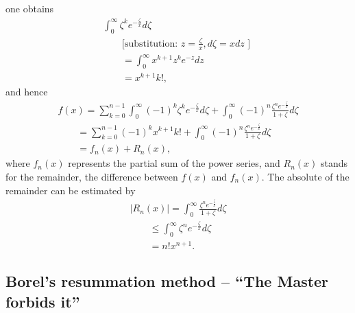 {\begin{equation}
\label{2011-m-ch-dsee15}
\end{equation}
one obtains
\begin{equation}
\begin{split}
\int_0^\infty  \zeta^k  e^{-\frac{\zeta}{x}}   d\zeta     \\
\qquad \textrm{[substitution:  }z=\frac{\zeta}{x}, d \zeta =x dz  \textrm{ ]  } \\
\qquad = \int_0^\infty x^{k+1} z^k  e^{-z}   dz
\\
\qquad =  x^{k+1} k! ,
\end{split}
\label{2011-m-ch-dsee16}
\end{equation}
and hence
\begin{equation}
\begin{split}
f(x)  =
\sum_{k=0}^{n-1}\int_0^\infty (-1)^k \zeta^k  e^{-\frac{\zeta}{x}}   d\zeta
 +
\int_0^\infty (-1)^n \frac{\zeta^ne^{-\frac{\zeta}{x}}}{1+\zeta}
d\zeta  \\
\qquad =
\sum_{k=0}^{n-1}  (-1)^k x^{k+1} k!
 +
\int_0^\infty (-1)^n \frac{\zeta^ne^{-\frac{\zeta}{x}}}{1+\zeta}
d\zeta  \\
\qquad =
f_n(x)  +R_n(x),
\end{split}
\label{2011-m-ch-dsee17}
\end{equation}
where $f_n(x)$ represents the partial sum of the power series, and $R_n(x)$ stands for the remainder,
the difference between $f(x)$ and $f_n(x)$.
The absolute of the remainder can be estimated by
\begin{equation}
\begin{split}
\left| R_n(x)\right|
=
\int_0^\infty  \frac{\zeta^n e^{-\frac{\zeta}{x}}}{1+\zeta} d\zeta \\
\qquad \le
\int_0^\infty  \zeta^n e^{-\frac{\zeta}{x}} d\zeta  \\
\qquad = n! x^{n+1}.
\end{split}
\label{2011-m-ch-dsee18}
\end{equation}\eproof
}


\subsection{Borel's resummation method -- ``The Master forbids it''}

